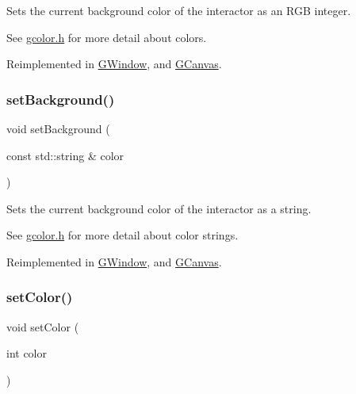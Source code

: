 Sets the current background color of the interactor as an R\+GB integer. 

See \mbox{\hyperlink{gcolor_8h_source}{gcolor.\+h}} for more detail about colors. 

Reimplemented in \mbox{\hyperlink{classGWindow_a427fefbbc34e39e5df27a807da488e0d}{G\+Window}}, and \mbox{\hyperlink{classGCanvas_a427fefbbc34e39e5df27a807da488e0d}{G\+Canvas}}.

\mbox{\label{classGDrawingSurface_ab4677ab2474e68b07aa56605af92a84a}} 
\subsubsection{\texorpdfstring{set\+Background()}{setBackground()}\hspace{0.1cm}{\footnotesize\ttfamily [2/2]}}
{\footnotesize\ttfamily void set\+Background (\begin{DoxyParamCaption}\item[{const std\+::string \&}]{color }\end{DoxyParamCaption})\hspace{0.3cm}{\ttfamily [virtual]}}



Sets the current background color of the interactor as a string. 

See \mbox{\hyperlink{gcolor_8h_source}{gcolor.\+h}} for more detail about color strings. 

Reimplemented in \mbox{\hyperlink{classGWindow_a222fcfb542aa6094c7e0de671bd69627}{G\+Window}}, and \mbox{\hyperlink{classGCanvas_a222fcfb542aa6094c7e0de671bd69627}{G\+Canvas}}.

\mbox{\label{classGDrawingSurface_a75b9cb32ff80bf061791beb01a8433d0}} 
\subsubsection{\texorpdfstring{set\+Color()}{setColor()}\hspace{0.1cm}{\footnotesize\ttfamily [1/2]}}
{\footnotesize\ttfamily void set\+Color (\begin{DoxyParamCaption}\item[{int}]{color }\end{DoxyParamCaption})\hspace{0.3cm}{\ttfamily [virtual]}}



